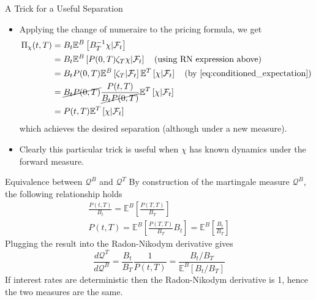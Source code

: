 \documentclass{beamer}
\begin{document}
\begin{frame}{A Trick for a Useful Separation}
	\begin{itemize}
		\item Applying the change of numeraire to the pricing formula, we get
		\begin{equation*}
			\begin{aligned}
			\Pi_\chi(t,T) & = B_t\mathbb{E}^B\left[B^{-1}_T\chi|\mathcal{F}_t\right] \\
			& = B_t\mathbb{E}^B\left[P(0,T)\zeta_T\chi|\mathcal{F}_t\right]\quad\text{(using RN expression above)}\\
			& = B_tP(0,T)\mathbb{E}^B\left[\zeta_T|\mathcal{F}_t\right]\mathbb{E}^T\left[\chi|\mathcal{F}_t\right]\quad\text{(by \cref{eq:conditioned_expectation})}\\
			& = \cancel{B_tP(0,T)}\frac{P(t,T)}{\cancel{B_tP(0,T)}}\mathbb{E}^T\left[\chi|\mathcal{F}_t\right] \\
			& = P(t,T)\mathbb{E}^T\left[\chi|\mathcal{F}_t\right] \\
			\end{aligned}
		\end{equation*}
		which achieves the desired separation (although under a new measure).
		\item Clearly this particular trick is useful when $\chi$ has known dynamics under the forward measure.
	\end{itemize}
\end{frame}

\begin{frame}{Equivalence between $\mathcal{Q}^B$ and $\mathcal{Q}^T$}
By construction of the martingale measure $\mathcal{Q}^B$, the following relationship holds
\begin{equation*}
\begin{gathered}
\frac{P(t,T)}{B_t}=\mathbb{E}^B\left[\frac{P(T,T)}{B_T}\right]\\[0.3cm]
P(t,T)=\mathbb{E}^B\left[\frac{P(T,T)}{B_T}B_t\right] = \mathbb{E}^B\left[\frac{B_t}{B_T}\right]
\end{gathered}
\end{equation*}
Plugging the result into the Radon-Nikodym derivative gives
\begin{equation*}
	\frac{d\mathcal{Q}^T}{d\mathcal{Q}^B} = \frac{B_t}{B_T}\frac{1}{P(t,T)} =\frac{B_t/B_T}{\mathbb{E}^B[B_t/B_T]}
\end{equation*}	
If interest rates are deterministic then the Radon-Nikodym derivative is 1, hence the two measures are the same.
\end{frame}
\end{document}
